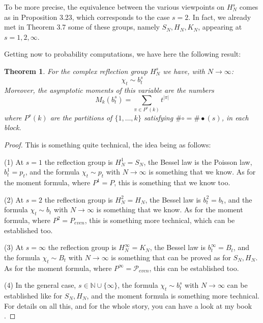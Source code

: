 \documentclass[12pt]{amsbook}
\newtheorem{theorem}{Theorem}[chapter]
\begin{document}
To be more precise, the equivalence between the various viewpoints on $H_N^s$ comes as in Proposition 3.23, which corresponds to the case $s=2$. In fact, we already met in Theorem 3.7 some of these groups, namely $S_N,H_N,K_N$, appearing at $s=1,2,\infty$.

\bigskip

Getting now to probability computations, we have here the following result:


\begin{theorem}
For the complex reflection group $H_N^s$ we have, with $N\to\infty$:
$$\chi_t\sim b^s_t$$
Moreover, the asymptotic moments of this variable are the numbers
$$M_k(b_t^s)=\sum_{\pi\in P^s(k)}t^{|\pi|}$$
where $P^s(k)$ are the partitions of $\{1,\ldots,k\}$ satisfying $\#\circ=\#\bullet(s)$, in each block.
\end{theorem}

\begin{proof}
This is something quite technical, the idea being as follows:

\medskip

(1) At $s=1$ the reflection group is $H_N^1=S_N$, the Bessel law is the Poisson law, $b_t^1=p_t$, and the formula $\chi_t\sim p_t$ with $N\to\infty$ is something that we know. As for the moment formula, where $P^1=P$, this is something that we know too.

\medskip

(2) At $s=2$ the reflection group is $H_N^2=H_N$, the Bessel law is $b_t^2=b_t$, and the formula $\chi_t\sim b_t$ with $N\to\infty$ is something that we know. As for the moment formula, where $P^2=P_{even}$, this is something more technical, which can be established too.

\medskip

(3) At $s=\infty$ the reflection group is $H_N^\infty=K_N$, the Bessel law is $b_t^\infty=B_t$, and the formula $\chi_t\sim B_t$ with $N\to\infty$ is something that can be proved as for $S_N,H_N$. As for the moment formula, where $P^\infty=\mathcal P_{even}$, this can be established too.

\medskip

(4) In the general case, $s\in\mathbb N\cup\{\infty\}$, the formula $\chi_t\sim b_t^s$ with $N\to\infty$ can be established like for $S_N,H_N$, and the moment formula is something more technical. For details on all this, and for the whole story, you can have a look at my book \cite{ba2}.
\end{proof}
\end{document}
